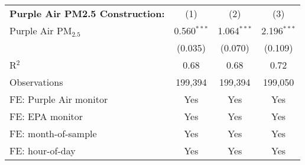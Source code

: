 
\begin{tabular}{lccc}
\textbf{Purple Air PM2.5 Construction:} & (1) & (2) & (3)\\
Purple Air PM$_{2.5}$ & 0.560$^{***}$ & 1.064$^{***}$ & 2.196$^{***}$\\
  & (0.035) & (0.070) & (0.109)\\
R$^2$ & 0.68 & 0.68 & 0.72\\
Observations & 199,394 & 199,394 & 199,050\\
FE: Purple Air monitor & Yes & Yes & Yes\\
FE: EPA monitor & Yes & Yes & Yes\\
FE: month-of-sample & Yes & Yes & Yes\\
FE: hour-of-day & Yes & Yes & Yes\\
\bottomrule
\end{tabular}


